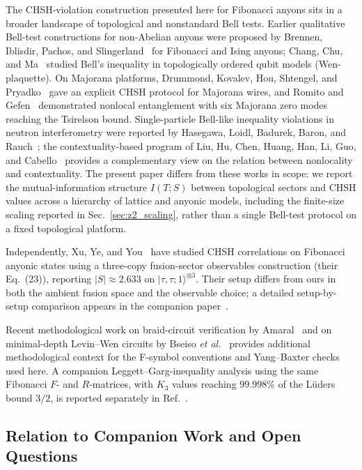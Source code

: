 \documentclass[aps,pra,twocolumn,superscriptaddress,showpacs,floatfix]{revtex4-2}
\begin{document}
The CHSH-violation construction presented here for Fibonacci anyons sits in
a broader landscape of topological and nonstandard Bell tests. Earlier
qualitative Bell-test constructions for non-Abelian anyons were proposed by
Brennen, Iblisdir, Pachos, and Slingerland~\cite{Brennen2009} for Fibonacci
and Ising anyons; Chang, Chu, and Ma~\cite{ChangChuMa2017} studied Bell's
inequality in topologically ordered qubit models (Wen-plaquette). On Majorana
platforms, Drummond, Kovalev, Hou, Shtengel, and Pryadko~\cite{Drummond2014}
gave an explicit CHSH protocol for Majorana wires, and Romito and
Gefen~\cite{RomitoGefen2017} demonstrated nonlocal entanglement with six
Majorana zero modes reaching the Tsirelson bound. Single-particle Bell-like
inequality violations in neutron interferometry were reported by
Hasegawa, Loidl, Badurek, Baron, and
Rauch~\cite{Hasegawa2003}; the contextuality-based program of
Liu, Hu, Chen, Huang, Han, Li, Guo, and
Cabello~\cite{Liu2016Cabello} provides a complementary view on the relation
between nonlocality and contextuality. The present paper differs from these
works in scope: we report the mutual-information structure $I(T;S)$ between
topological sectors and CHSH values across a hierarchy of lattice and anyonic
models, including the finite-size scaling reported in
Sec.~\ref{sec:z2_scaling}, rather than a single Bell-test protocol on a fixed
topological platform.

Independently, Xu, Ye, and You~\cite{Xu2025} have
studied CHSH correlations on Fibonacci anyonic states using a three-copy
fusion-sector observables construction (their Eq.~(23)), reporting
$|S| \approx 2.633$ on $|\tau,\tau;1\rangle^{\otimes 3}$. Their setup differs
from ours in both the ambient fusion space and the observable choice; a
detailed setup-by-setup comparison appears in the companion
paper~\cite{Sayim2026fibonacci}.

Recent methodological work on braid-circuit verification by
Amaral~\cite{Amaral2025} and on minimal-depth Levin--Wen circuits by
Bseiso \emph{et al.}~\cite{Bseiso2024} provides additional methodological
context for the F-symbol conventions and Yang--Baxter checks used here. A
companion Leggett--Garg-inequality analysis using the same Fibonacci $F$- and
$R$-matrices, with $K_3$ values reaching $99.998\%$ of the L\"uders bound
$3/2$, is reported separately in Ref.~\cite{Sayim2026LGI}.

\subsection{Relation to Companion Work and Open Questions}
\end{document}
